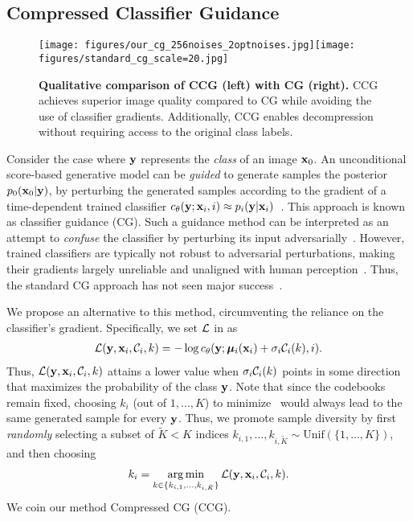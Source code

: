 

\subsection{Compressed Classifier Guidance}\label{appendix:classifier-guidance}
\begin{figure*}[t]
    \centering
    \texttt{[image: figures/our\_cg\_256noises\_2optnoises.jpg]}\hspace{1cm}\texttt{[image: figures/standard\_cg\_scale=20.jpg]}
    \caption{\textbf{Qualitative comparison of CCG (left) with CG (right).} CCG achieves superior image quality compared to CG while avoiding the use of classifier gradients. Additionally, CCG enables decompression without requiring access to the original class labels.}
    \label{fig:cg_visual_comparison}
\end{figure*}
Consider the case where ${\mathbf{y}}$ represents the \emph{class} of an image ${\mathbf{x}}_{0}$.
An unconditional score-based generative model can be \emph{guided} to generate samples the posterior $p_{0}({\mathbf{x}}_{0}|{\mathbf{y}})$, by perturbing the generated samples according to the gradient of a time-dependent trained classifier $c_{\theta}({\mathbf{y}};{\mathbf{x}}_{i},i)\approx p_{i}({\mathbf{y}}|{\mathbf{x}}_{i})$~\citep{dhariwal2021diffusion}.
This approach is known as classifier guidance (CG).
Such a guidance method can be interpreted as an attempt to \emph{confuse} the classifier by perturbing its input adversarially~\citep{ho2021classifier}.
However, trained classifiers are typically not robust to adversarial perturbations, making their gradients largely unreliable and unaligned with human perception~\citep{advattacks,tsipras2018robustness,ganz-perceptual}.
Thus, the standard CG approach has not seen major success~\citep{ho2021classifier}.


We propose an alternative to this method, circumventing the reliance on the classifier's gradient.
Specifically, we set ${\mathcal{L}}$ in  as
\begin{align}
{\mathcal{L}}({\mathbf{y}},{\mathbf{x}}_{i},{\mathcal{C}}_{i},k)=-\log{c_{\theta}({\mathbf{y}};{\bm{\mu}}_{i}({\mathbf{x}}_{i})+\sigma_{i}{\mathcal{C}}_{i}(k),i)}.\label{eq:classifier-guidance-ours}
\end{align}
Thus, ${\mathcal{L}}({\mathbf{y}},{\mathbf{x}}_{i},{\mathcal{C}}_{i},k)$ attains a lower value when $\sigma_{i}{\mathcal{C}}_{i}(k)$ points in some direction that maximizes the probability of the class ${\mathbf{y}}$.
Note that since the codebooks remain fixed, choosing $k_{i}$ (out of $1,\hdots,K$) to minimize~ would always lead to the same generated sample for every ${\mathbf{y}}$.
Thus, we promote sample diversity by first \emph{randomly} selecting a subset of $\tilde{K}<K$ indices $k_{i,1},\hdots,k_{i,\tilde{K}}\sim\text{Unif}(\{1,\hdots,K\})$, and then choosing
\begin{align}
    k_{i}=\operatorname*{arg\,min}_{k\in\{k_{i,1},\hdots,k_{i,\tilde{K}}\}}{\mathcal{L}}({\mathbf{y}},{\mathbf{x}}_{i},{\mathcal{C}}_{i},k).
\end{align}
We coin our method Compressed CG (CCG).


